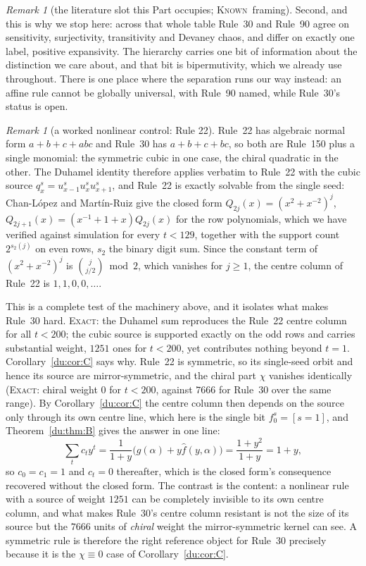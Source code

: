 \documentclass[11pt]{article}
\theoremstyle{definition}
\theoremstyle{remark}
\newtheorem{remark}[theorem]{Remark}
\newcommand{\EXACT}{\textsc{Exact}}
\newcommand{\KNOWN}{\textsc{Known}}
\begin{document}
\begin{remark}[the literature slot this Part occupies; \KNOWN\ framing]
Second, and this is why we stop here: across that whole table Rule~30 and Rule~90 agree on
sensitivity, surjectivity, transitivity and Devaney chaos, and differ on exactly one label, positive
expansivity. The hierarchy carries one bit of information about the distinction we care about, and that
bit is bipermutivity, which we already use throughout. There is one place where the separation runs our
way instead: an affine rule cannot be globally universal, with Rule~90 named, while Rule~30's status is
open.
\end{remark}

\begin{remark}[a worked nonlinear control: Rule 22]\label{du:rule22}
Rule~22 has algebraic normal form $a+b+c+abc$ and Rule~30 has $a+b+c+bc$, so both are Rule~150 plus a
single monomial: the symmetric cubic in one case, the chiral quadratic in the other. The Duhamel
identity therefore applies verbatim to Rule~22 with the cubic source $q^s_x=u^s_{x-1}u^s_xu^s_{x+1}$,
and Rule~22 is exactly solvable from the single seed: Chan-L\'opez and Mart\'in-Ruiz \cite{CLMR} give
the closed form $Q_{2j}(x)=(x^2+x^{-2})^j$, $Q_{2j+1}(x)=(x^{-1}+1+x)Q_{2j}(x)$ for the row
polynomials, which we have verified against simulation for every $t<129$, together with the support
count $2^{s_2(j)}$ on even rows, $s_2$ the binary digit sum. Since the constant term of
$(x^2+x^{-2})^j$ is $\binom{j}{j/2}\bmod2$, which vanishes for $j\ge1$, the centre column of Rule~22
is $1,1,0,0,\dots$.

This is a complete test of the machinery above, and it isolates what makes Rule~30 hard. \EXACT: the
Duhamel sum reproduces the Rule~22 centre column for all $t<200$; the cubic source is supported
exactly on the odd rows and carries substantial weight, $1251$ ones for $t<200$, yet contributes
nothing beyond $t=1$. Corollary~\ref{du:cor:C} says why. Rule~22 is symmetric, so its single-seed
orbit and hence its source are mirror-symmetric, and the chiral part $\chi$ vanishes identically
(\EXACT: chiral weight $0$ for $t<200$, against $7666$ for Rule~30 over the same range). By
Corollary~\ref{du:cor:C} the centre column then depends on the source only through its own centre
line, which here is the single bit $f^s_0=[s=1]$, and Theorem~\ref{du:thm:B} gives the answer in one
line:
\[
  \sum_t c_t y^t=\frac{1}{1+y}\bigl(\hat g(\alpha)+y\hat f(y,\alpha)\bigr)=\frac{1+y^2}{1+y}=1+y ,
\]
so $c_0=c_1=1$ and $c_t=0$ thereafter, which is the closed form's consequence recovered without the
closed form. The contrast is the content: a nonlinear rule with a source of weight $1251$ can be
completely invisible to its own centre column, and what makes Rule~30's centre column resistant is
not the size of its source but the $7666$ units of \emph{chiral} weight the mirror-symmetric kernel
can see. A symmetric rule is therefore the right reference object for Rule~30 precisely because it is
the $\chi\equiv0$ case of Corollary~\ref{du:cor:C}.
\end{remark}
\end{document}
